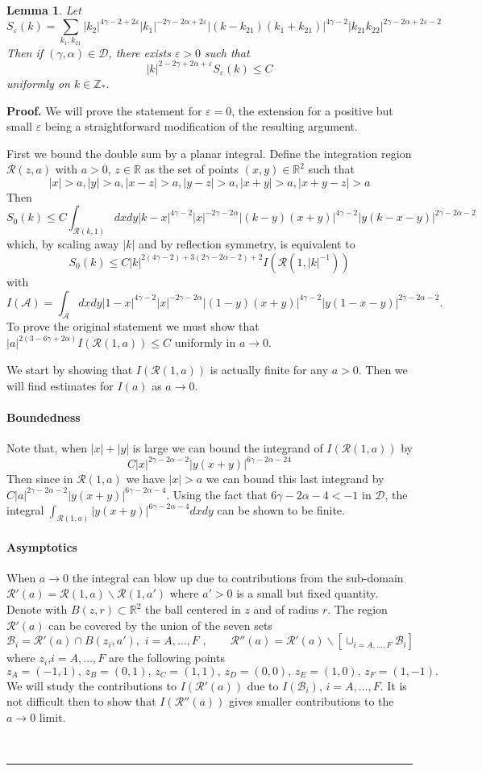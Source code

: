 \documentclass[a4paper,12pt,reqno]{article}
\newcommand{\eps}{\varepsilon}
\newcommand{\RR}{\mathbb{R}}
\newcommand{\DD}{\mathcal{D}}
\newcommand{\cR}{\mathcal{R}}
\newcommand{\cB}{\mathcal{B}}
\newcommand{\ZZ}{\mathbb{Z}}
\newtheorem{lemma}[theorem]{Lemma}
\newenvironment{proof}[1][Proof]{\textbf{#1.} }{\ \rule{0.5em}{0.5em}}
\begin{document}
\begin{lemma}
\label{lemma:sum-bound}
Let
$$
S_\eps(k) =  \sum_{k_1,k_{21}}   |k_2|^{4\gamma-2+2\eps} |k_1|^{-2\gamma-2\alpha+2\eps}
|(k-k_{21})(k_1+k_{21})|^{4\gamma-2} 
 |k_{21} k_{22}|^{2\gamma-2\alpha+2\eps-2}
$$
Then if $(\gamma,\alpha) \in \DD$, there exists $\eps > 0$ such that
$$
 |k|^{2-2\gamma+2\alpha+\eps} S_{\eps}(k)
 \le C
$$  
uniformly on $k \in \ZZ_*$.
\end{lemma}
\begin{proof}
We will prove the statement for $\eps = 0$, the extension for a positive but small $\eps$ being a straightforward modification of the resulting argument.

First we bound the double sum by a planar integral. Define the integration region $\cR(z,a)$ with $a>0$, $z\in\RR$ as the set of points $(x,y) \in \RR^2$ such that
$$
|x|>a, |y| > a, |x-z|>a, |y-z|>a, |x+y|>a, |x+y-z|>a
$$
Then 
$$
S_0(k) \le C \int_{\cR(k,1)} dx dy |k-x|^{4\gamma-2} |x|^{-2\gamma-2\alpha}
|(k-y)(x+y)|^{4\gamma-2} 
 |y (k-x-y)|^{2\gamma-2\alpha-2}
$$
which, by scaling away $|k|$ and by reflection symmetry, is equivalent to
$$
S_0(k) \le C |k|^{2(4\gamma-2)+3(2\gamma-2\alpha-2)+2} I(\cR(1,|k|^{-1}))
$$
with
$$
I(\mathcal{A}) =
\int_{\mathcal{A}} dx dy |1-x|^{4\gamma-2} |x|^{-2\gamma-2\alpha}
|(1-y)(x+y)|^{4\gamma-2} 
 |y (1-x-y)|^{2\gamma-2\alpha-2}.
$$
To prove the original statement we must show that
$
|a|^{2(3-6\gamma+2\alpha)} I(\cR(1,a)) \le C
$ uniformly in $a \to 0$.

We start by showing that $I(\cR(1,a))$ is actually finite for any $a > 0$. Then we will find estimates for $I(a)$ as $a \to 0$.

\paragraph{Boundedness}
Note that, when $|x|+|y|$ is large we can bound the integrand of $I(\cR(1,a))$ by
$$
C |x|^{2\gamma-2\alpha-2}
|y(x+y)|^{6\gamma-2\alpha-24}
$$
Then since in $\cR(1,a)$ we have $|x|>a$ we can bound this last integrand by
$C |a|^{2\gamma-2\alpha-2}
|y(x+y)|^{6\gamma-2\alpha-4}$. Using the fact  that $6\gamma-2\alpha-4 < -1$ in $\DD$, the integral
$
\int_{\cR(1,a)} |y(x+y)|^{6\gamma-2\alpha-4} dx dy
$ can be shown to be finite.

\paragraph{Asymptotics} When $a \to 0$ the integral can blow up due to contributions from the sub-domain $\cR'(a) = \cR(1,a) \backslash \cR(1,a')$ where $a'>0$ is a small but fixed quantity.  Denote with $B(z,r) \subset \RR^2$ the ball  centered in $z$ and of radius $r$. The region $\cR'(a)$ can be covered by the union of the  seven sets 
$$
\cB_i = \cR'(a) \cap B(z_i, a'),\,\, i=A,\dots,F\,\,, \qquad \cR''(a) = \cR'(a)\backslash \left[\cup_{i=A,\dots,F} \cB_i \right]
$$
where $z_i$,$i=A,\dots,F$ are the following points
$$
z_A = (-1,1),\, z_B = (0,1),\, z_C=(1,1),\, z_D=(0,0),\, z_E=(1,0),\, z_F=(1,-1).
$$
We will study the contributions to $I(\cR'(a))$ due to $I(\cB_i)$, $i=A,\dots,F$. It is not difficult then to show that $I(\cR''(a))$ gives smaller contributions to the $a\to 0$ limit.


\end{proof}
\end{document}
